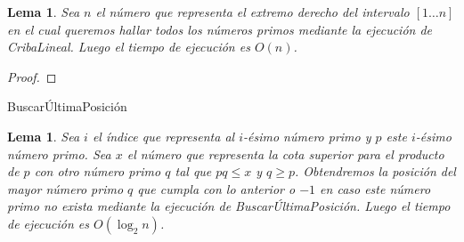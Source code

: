 \documentclass[10pt]{article}
\DeclarePairedDelimiter\floor{\lfloor}{\rfloor}
\newtheorem{lemma}[theorem]{Lema}
\theoremstyle{definition}
\theoremstyle{remark}
\begin{document}
\begin{lemma}
Sea $n$ el n\'umero que representa el extremo derecho del intervalo $[1 \dots n]$
en el cual queremos hallar todos los n\'umeros primos mediante la ejecuci\'on de CribaLineal. Luego el tiempo de ejecuci\'on es $O(n)$.
\end{lemma}

\begin{proof}
\end{proof}

\begin{algorithm}[H]
\SetAlgoLined
\DontPrintSemicolon
{}
\caption{Buscar\'UltimaPosici\'on\label{BUP}}
\end{algorithm}

\begin{lemma}
Sea $i$ el \'indice que representa al $i$-\'esimo n\'umero primo
y $p$ este $i$-\'esimo n\'umero primo.
Sea $x$ el n\'umero que representa la cota superior para el producto de $p$ con otro n\'umero primo $q$ tal que $pq \leq x$ y $q \geq p$.
Obtendremos la posici\'on del mayor n\'umero primo $q$ que cumpla con lo anterior o
$-1$ en caso este n\'umero primo no exista
mediante la ejecuci\'on de Buscar\'UltimaPosici\'on.
Luego el tiempo de ejecuci\'on es $O(\log_2 n)$.
\end{lemma}
\end{document}
